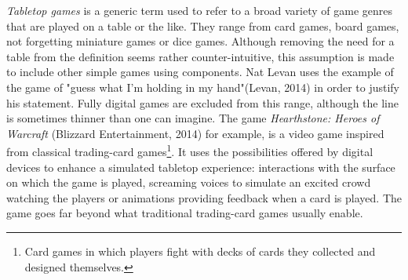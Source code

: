 \textit{Tabletop games} is a generic term used to refer to a broad variety of game genres that are played on a table or the like. They range from card games, board games, not forgetting miniature games or dice games. Although removing the need for a table from the definition seems rather counter-intuitive, this assumption is made to include other simple games using components. Nat Levan uses the example of the game of "guess what I'm holding in my hand"(Levan, 2014)\cite{web:oak} in order to justify his statement. Fully digital games are excluded from this range, although the line is sometimes thinner than one can imagine. The game \textit{Hearthstone: Heroes of Warcraft} (Blizzard Entertainment, 2014) for example, is a video game inspired from classical trading-card games\footnote{Card games in which players fight with decks of cards they collected and designed themselves.}. It uses the possibilities offered by digital devices to enhance a simulated tabletop experience: interactions with the surface on which the game is played, screaming voices to simulate an excited crowd watching the players or animations providing feedback when a card is played. The game goes far beyond what traditional trading-card games usually enable.

